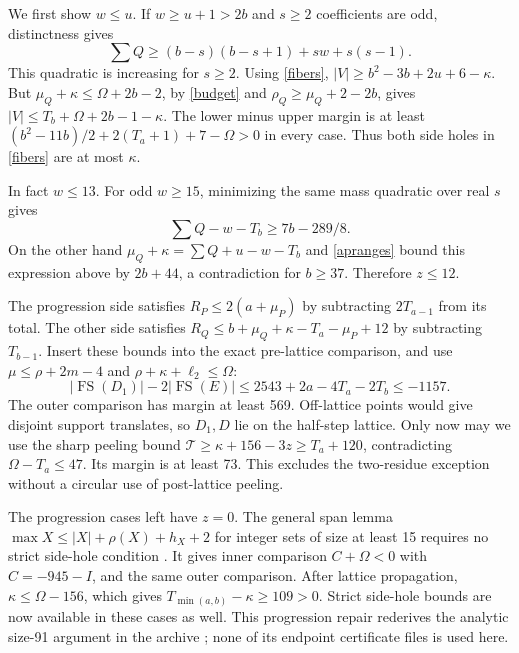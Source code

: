 \documentclass[11pt,a4paper]{article}
\newcommand{\FS}{\operatorname{FS}}
\newcommand{\T}{\mathcal T}
\begin{document}
We first show $w\le u$. If $w\ge u+1>2b$ and $s\ge2$ coefficients
are odd, distinctness gives
\[
 \sum Q\ge(b-s)(b-s+1)+sw+s(s-1).
\]
This quadratic is increasing for $s\ge2$. Using \eqref{fibers},
$|V|\ge b^2-3b+2u+6-\kappa$.
But $\mu_Q+\kappa\le\Omega+2b-2$, by \eqref{budget} and
$\rho_Q\ge\mu_Q+2-2b$, gives
$|V|\le T_b+\Omega+2b-1-\kappa$.
The lower minus upper margin is at least
$(b^2-11b)/2+2(T_a+1)+7-\Omega>0$ in every case.
Thus both side holes in \eqref{fibers} are at most $\kappa$.

In fact $w\le13$. For odd $w\ge15$, minimizing the same mass
quadratic over real $s$ gives
\[
 \sum Q-w-T_b\ge7b-289/8.
\]
On the other hand $\mu_Q+\kappa=\sum Q+u-w-T_b$ and
\eqref{apranges} bound this expression above by $2b+44$,
a contradiction for $b\ge37$. Therefore $z\le12$.

The progression side satisfies $R_P\le2(a+\mu_P)$ by subtracting
$2T_{a-1}$ from its total. The other side satisfies
$R_Q\le b+\mu_Q+\kappa-T_a-\mu_P+12$ by subtracting $T_{b-1}$.
Insert these bounds into the exact pre-lattice comparison, and use
$\mu\le\rho+2m-4$ and $\rho+\kappa+\ell_2\le\Omega$:
\[
 |\FS(D_1)|-2|\FS(E)|
 \le2543+2a-4T_a-2T_b\le-1157.
\]
The outer comparison has margin at least 569. Off-lattice points would
give disjoint support translates, so $D_1,D$ lie on the half-step lattice.
Only now may we use the sharp peeling bound
$\T\ge\kappa+156-3z\ge T_a+120$, contradicting
$\Omega-T_a\le47$. Its margin is at least 73.
This excludes the two-residue exception without a circular use of
post-lattice peeling.

The progression cases left have $z=0$. The general span lemma
$\max X\le |X|+\rho(X)+h_X+2$ for integer sets of size at least 15
requires no strict side-hole condition \cite{previous}. It gives inner
comparison $C+\Omega<0$ with $C=-945-I$, and the same outer comparison.
After lattice propagation, $\kappa\le\Omega-156$, which gives
$T_{\min(a,b)}-\kappa\ge109>0$. Strict side-hole bounds are now
available in these cases as well.
This progression repair rederives the analytic size-91 argument
in the archive \cite{archive}; none of its endpoint certificate files
is used here.
\end{document}
